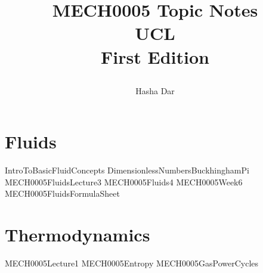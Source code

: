 \documentclass[12pt,a4paper, twoside]{book}
\numberwithin{equation}{section}
\begin{document}
\title{
  {MECH0005 Topic Notes}\\
  {\large UCL}\\
  {\large First Edition}
  \author{Hasha Dar}
}
\maketitle
{\pagestyle{plain}
\tableofcontents
\cleardoublepage}
\chapter{Fluids}
{IntroToBasicFluidConcepts}
{DimensionlessNumbersBuckhinghamPi}
{MECH0005FluidsLecture3}
{MECH0005Fluids4}
{MECH0005Week6}
{MECH0005FluidsFormulaSheet}
\chapter{Thermodynamics}
{MECH0005Lecture1}
{MECH0005Entropy}
{MECH0005GasPowerCycles}
\listoffigures
\end{document}
